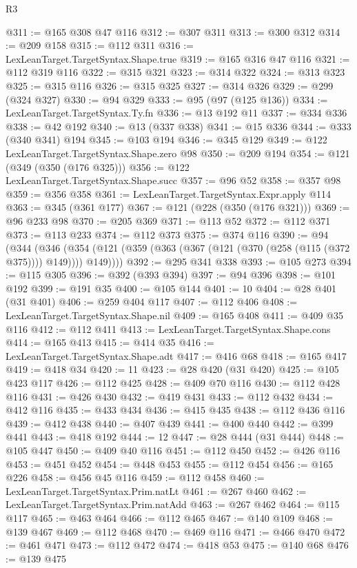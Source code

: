 \begin{lexlean}{R3}
\begin{coremodule}
{{{{{{{{{{{{{{{{{{{{{{{{{{{{{{{{{{{{{{{{{{{{{{{{{{{{{{{{{{{{{{{{{{{{{{{{{{{@311 := @165 @308 @47 @116
@312 := @307 @311
@313 := @300 @312
@314 := @209 @158
@315 := @112 @311
@316 := LexLeanTarget.TargetSyntax.Shape.true
@319 := @165 @316 @47 @116
@321 := @112 @319 @116
@322 := @315 @321
@323 := @314 @322
@324 := @313 @323
@325 := @315 @116
@326 := @315 @325
@327 := @314 @326
@329 := @299 (@324 @327)
@330 := @94 @329
@333 := @95 (@97 (@125 @136))
@334 := LexLeanTarget.TargetSyntax.Ty.fn
@336 := @13 @192 @11
@337 := @334 @336
@338 := @42 @192
@340 := @13 (@337 @338)
@341 := @15 @336
@344 := @333 (@340 @341) @194
@345 := @103 @194
@346 := @345 @129
@349 := @122 LexLeanTarget.TargetSyntax.Shape.zero @98
@350 := @209 @194
@354 := @121 (@349 (@350 (@176 @325)))
@356 := @122 LexLeanTarget.TargetSyntax.Shape.succ
@357 := @96 @52
@358 := @357 @98
@359 := @356 @358
@361 := LexLeanTarget.TargetSyntax.Expr.apply @114
@363 := @345 (@361 @177)
@367 := @121 (@228 (@350 (@176 @321)))
@369 := @96 @233 @98
@370 := @205 @369
@371 := @113 @52
@372 := @112 @371
@373 := @113 @233
@374 := @112 @373
@375 := @374 @116
@390 := @94
    (@344
      (@346 (@354 (@121 (@359 (@363 (@367 (@121 (@370 (@258 (@115 (@372 @375)))) @149)))) @149))))
@392 := @295 @341 @338
@393 := @105 @273
@394 := @115 @305
@396 := @392 (@393 @394)
@397 := @94 @396
@398 := @101 @192
@399 := @191 @35
@400 := @105 @144
@401 := 10
@404 := @28 @401 (@31 @401)
@406 := @259 @404 @117
@407 := @112 @406
@408 := LexLeanTarget.TargetSyntax.Shape.nil
@409 := @165 @408
@411 := @409 @35 @116
@412 := @112 @411
@413 := LexLeanTarget.TargetSyntax.Shape.cons
@414 := @165 @413
@415 := @414 @35
@416 := LexLeanTarget.TargetSyntax.Shape.adt
@417 := @416 @68
@418 := @165 @417
@419 := @418 @34
@420 := 11
@423 := @28 @420 (@31 @420)
@425 := @105 @423 @117
@426 := @112 @425
@428 := @409 @70 @116
@430 := @112 @428 @116
@431 := @426 @430
@432 := @419 @431
@433 := @112 @432
@434 := @412 @116
@435 := @433 @434
@436 := @415 @435
@438 := @112 @436 @116
@439 := @412 @438
@440 := @407 @439
@441 := @400 @440
@442 := @399 @441
@443 := @418 @192
@444 := 12
@447 := @28 @444 (@31 @444)
@448 := @105 @447
@450 := @409 @40 @116
@451 := @112 @450
@452 := @426 @116
@453 := @451 @452
@454 := @448 @453
@455 := @112 @454
@456 := @165 @226
@458 := @456 @45 @116
@459 := @112 @458
@460 := LexLeanTarget.TargetSyntax.Prim.natLt
@461 := @267 @460
@462 := LexLeanTarget.TargetSyntax.Prim.natAdd
@463 := @267 @462
@464 := @115 @117
@465 := @463 @464
@466 := @112 @465
@467 := @140 @109
@468 := @139 @467
@469 := @112 @468
@470 := @469 @116
@471 := @466 @470
@472 := @461 @471
@473 := @112 @472
@474 := @418 @53
@475 := @140 @68
@476 := @139 @475
}}}}}}}}}}}}}}}}}}}}}}}}}}}}}}}}}}}}}}}}}}}}}}}}}}}}}}}}}}}}}}}}}}}}}}}}}}}
\end{coremodule}
\end{lexlean}
